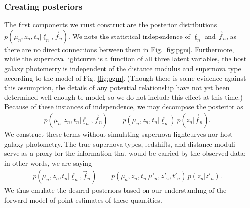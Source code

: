 \documentclass[12pt, onecolumn]{emulateapj}
\newcommand{\textul}{\underline}
\begin{document}
%
%
%
%

\subsubsection{Creating posteriors}
\label{sec:posteriors}

The first components we must construct are the posterior distributions $p(\mu_{n}, z_{n}, t_{n} | \textul{\ell}_{n}, \vec{f}_{n})$.  We note the statistical independence of $\textul{\ell}_{n}$ and $\vec{f}_{n}$, as there are no direct connections between them in Fig. \ref{fig:pgm}.  Furthermore, while the supernova lightcurve is a function of all three latent variables, the host galaxy photometry is independent of the distance modulus and supernova type according to the model of Fig. \ref{fig:pgm}.  (Though there is some evidence against this assumption, the details of any potential relationship have not yet been determined well enough to model, so we do not include this effect at this time.)  Because of these instances of independence, we may decompose the posterior as
\begin{align}
\label{eq:posteriors_decompose}
p(\mu_{n}, z_{n}, t_{n} | \textul{\ell}_{n}, \vec{f}_{n}) &= p(\mu_{n}, z_{n}, t_{n} | \textul{\ell}_{n})\ p(z_{n} | \vec{f}_{n}).
\end{align}
We construct these terms without simulating supernova lightcurves nor host galaxy photometry.  The true supernova types, redshifts, and distance moduli serve as a proxy for the information that would be carried by the observed data; in other words, we are saying
\begin{align}
\label{eq:posteriors_emulate}
p(\mu_{n}, z_{n}, t_{n} | \textul{\ell}_{n}, \vec{f}_{n}) &= p(\mu_{n}, z_{n}, t_{n} | \mu'_{n}, z'_{n}, t'_{n})\ p(z_{n} | z'_{n}).
\end{align}
We thus emulate the desired posteriors based on our understanding of the forward model of point estimates of these quantities.
\end{document}
